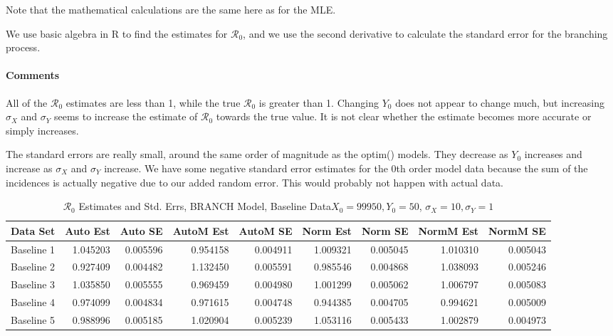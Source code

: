 \documentclass[12pt]{article}
\newcommand{\rr}{\ensuremath{\mathcal{R}_0}}
\begin{document}
Note that the mathematical calculations are the same here as for the MLE.

We use basic algebra in R to find the estimates for $\rr$, and we use the second derivative to calculate the standard error for the branching process.

\paragraph{Comments}

All of the $\rr$ estimates are less than 1, while the true $\rr$ is greater than 1. Changing $Y_0$ does not appear to change much, but increasing $\sigma_X$ and $\sigma_Y$ seems to increase the estimate of $\rr$ towards the true value. It is not clear whether the estimate becomes more accurate or simply increases.

The standard errors are really small, around the same order of magnitude as the optim() models. They decrease as $Y_0$ increases and increase as $\sigma_X$ and $\sigma_Y$ increase. We have some negative standard error estimates for the 0th order model data because the sum of the incidences is actually negative due to our added random error. This would probably not happen with actual data.

\begin{table}[H]
	
	\caption{$\rr$ Estimates and Std. Errs, BRANCH Model,
		Baseline Data$X_0 = 99950, Y_0 = 50$, 
		$\sigma_X = 10, \sigma_Y = 1$}
	\centering
	\begin{footnotesize}
		\hskip -1cm
	\begin{tabular}[t]{l|r|r|r|r|r|r|r|r}
		\hline
		Data Set & Auto Est & Auto SE & AutoM Est & AutoM SE & Norm Est & Norm SE & NormM Est & NormM SE\\
		\hline
		Baseline 1 & 1.045203 & 0.005596 & 0.954158 & 0.004911 & 1.009321 & 0.005045 & 1.010310 & 0.005043\\
		\hline
		Baseline 2 & 0.927409 & 0.004482 & 1.132450 & 0.005591 & 0.985546 & 0.004868 & 1.038093 & 0.005246\\
		\hline
		Baseline 3 & 1.035850 & 0.005555 & 0.969459 & 0.004980 & 1.001299 & 0.005062 & 1.006797 & 0.005083\\
		\hline
		Baseline 4 & 0.974099 & 0.004834 & 0.971615 & 0.004748 & 0.944385 & 0.004705 & 0.994621 & 0.005009\\
		\hline
		Baseline 5 & 0.988996 & 0.005185 & 1.020904 & 0.005239 & 1.053116 & 0.005433 & 1.002879 & 0.004973\\
		\hline
	\end{tabular}
\end{footnotesize}
\end{table}
\end{document}
